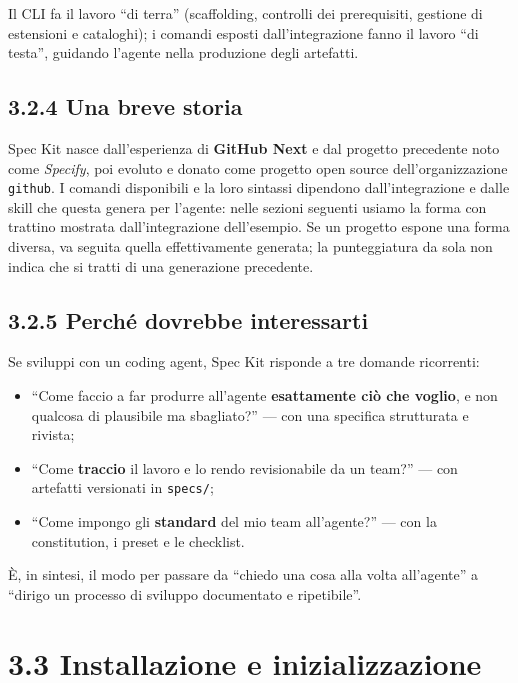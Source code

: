 \documentclass[
  italian,
  10pt,
]{book}
\providecommand{\tightlist}{%
  \setlength{\itemsep}{0pt}\setlength{\parskip}{0pt}}
\begin{document}
Il CLI fa il lavoro ``di terra'' (scaffolding, controlli dei
prerequisiti, gestione di estensioni e cataloghi); i comandi esposti
dall'integrazione fanno il lavoro ``di testa'', guidando l'agente nella
produzione degli artefatti.

\subsection{3.2.4 Una breve storia}\label{una-breve-storia}

Spec Kit nasce dall'esperienza di \textbf{GitHub Next} e dal progetto
precedente noto come \emph{Specify}, poi evoluto e donato come progetto
open source dell'organizzazione \texttt{github}. I comandi disponibili e
la loro sintassi dipendono dall'integrazione e dalle skill che questa
genera per l'agente: nelle sezioni seguenti usiamo la forma con trattino
mostrata dall'integrazione dell'esempio. Se un progetto espone una forma
diversa, va seguita quella effettivamente generata; la punteggiatura da
sola non indica che si tratti di una generazione precedente.

\subsection{3.2.5 Perché dovrebbe
interessarti}\label{perchuxe9-dovrebbe-interessarti}

Se sviluppi con un coding agent, Spec Kit risponde a tre domande
ricorrenti:

\begin{itemize}
\tightlist
\item
  ``Come faccio a far produrre all'agente \textbf{esattamente ciò che
  voglio}, e non qualcosa di plausibile ma sbagliato?'' --- con una
  specifica strutturata e rivista;
\item
  ``Come \textbf{traccio} il lavoro e lo rendo revisionabile da un
  team?'' --- con artefatti versionati in \texttt{specs/};
\item
  ``Come impongo gli \textbf{standard} del mio team all'agente?'' ---
  con la constitution, i preset e le checklist.
\end{itemize}

È, in sintesi, il modo per passare da ``chiedo una cosa alla volta
all'agente'' a ``dirigo un processo di sviluppo documentato e
ripetibile''.

\section{3.3 Installazione e
inizializzazione}\label{installazione-e-inizializzazione}
\end{document}
